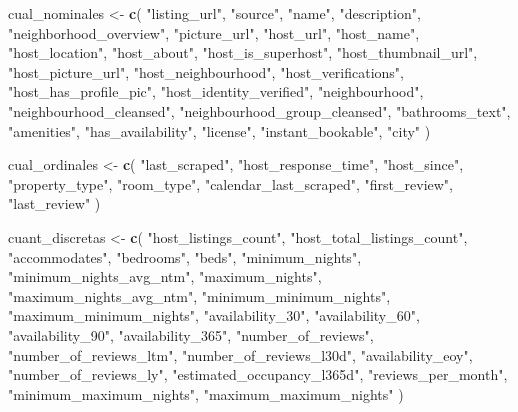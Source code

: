 \documentclass[
]{article}
\newenvironment{Shaded}{\begin{snugshade}}{\end{snugshade}}
\newcommand{\FunctionTok}[1]{\textcolor[rgb]{0.13,0.29,0.53}{\textbf{#1}}}
\newcommand{\NormalTok}[1]{#1}
\newcommand{\OtherTok}[1]{\textcolor[rgb]{0.56,0.35,0.01}{#1}}
\newcommand{\StringTok}[1]{\textcolor[rgb]{0.31,0.60,0.02}{#1}}
\begin{document}
\begin{Shaded}
\begin{Highlighting}[]
\NormalTok{cual\_nominales }\OtherTok{\textless{}{-}} \FunctionTok{c}\NormalTok{(}
    \StringTok{"listing\_url"}\NormalTok{,}
    \StringTok{"source"}\NormalTok{,}
    \StringTok{"name"}\NormalTok{,}
    \StringTok{"description"}\NormalTok{,}
    \StringTok{"neighborhood\_overview"}\NormalTok{,}
    \StringTok{"picture\_url"}\NormalTok{,}
    \StringTok{"host\_url"}\NormalTok{,}
    \StringTok{"host\_name"}\NormalTok{,}
    \StringTok{"host\_location"}\NormalTok{,}
    \StringTok{"host\_about"}\NormalTok{,}
    \StringTok{"host\_is\_superhost"}\NormalTok{,}
    \StringTok{"host\_thumbnail\_url"}\NormalTok{,}
    \StringTok{"host\_picture\_url"}\NormalTok{,}
    \StringTok{"host\_neighbourhood"}\NormalTok{,}
    \StringTok{"host\_verifications"}\NormalTok{,}
    \StringTok{"host\_has\_profile\_pic"}\NormalTok{,}
    \StringTok{"host\_identity\_verified"}\NormalTok{,}
    \StringTok{"neighbourhood"}\NormalTok{,}
    \StringTok{"neighbourhood\_cleansed"}\NormalTok{,}
    \StringTok{"neighbourhood\_group\_cleansed"}\NormalTok{,}
    \StringTok{"bathrooms\_text"}\NormalTok{,}
    \StringTok{"amenities"}\NormalTok{,}
    \StringTok{"has\_availability"}\NormalTok{,}
    \StringTok{"license"}\NormalTok{,}
    \StringTok{"instant\_bookable"}\NormalTok{,}
    \StringTok{"city"}
\NormalTok{)}

\NormalTok{cual\_ordinales }\OtherTok{\textless{}{-}} \FunctionTok{c}\NormalTok{(}
    \StringTok{"last\_scraped"}\NormalTok{,}
    \StringTok{"host\_response\_time"}\NormalTok{,}
    \StringTok{"host\_since"}\NormalTok{,}
    \StringTok{"property\_type"}\NormalTok{,}
    \StringTok{"room\_type"}\NormalTok{,}
    \StringTok{"calendar\_last\_scraped"}\NormalTok{,}
    \StringTok{"first\_review"}\NormalTok{,}
    \StringTok{"last\_review"}
\NormalTok{)}


\NormalTok{cuant\_discretas }\OtherTok{\textless{}{-}} \FunctionTok{c}\NormalTok{(}
    \StringTok{"host\_listings\_count"}\NormalTok{,}
    \StringTok{"host\_total\_listings\_count"}\NormalTok{,}
    \StringTok{"accommodates"}\NormalTok{,}
    \StringTok{"bedrooms"}\NormalTok{,}
    \StringTok{"beds"}\NormalTok{,}
    \StringTok{"minimum\_nights"}\NormalTok{,}
    \StringTok{"minimum\_nights\_avg\_ntm"}\NormalTok{,}
    \StringTok{"maximum\_nights"}\NormalTok{,}
    \StringTok{"maximum\_nights\_avg\_ntm"}\NormalTok{,}
    \StringTok{"minimum\_minimum\_nights"}\NormalTok{,}
    \StringTok{"maximum\_minimum\_nights"}\NormalTok{,}
    \StringTok{"availability\_30"}\NormalTok{,}
    \StringTok{"availability\_60"}\NormalTok{,}
    \StringTok{"availability\_90"}\NormalTok{,}
    \StringTok{"availability\_365"}\NormalTok{,}
    \StringTok{"number\_of\_reviews"}\NormalTok{,}
    \StringTok{"number\_of\_reviews\_ltm"}\NormalTok{,}
    \StringTok{"number\_of\_reviews\_l30d"}\NormalTok{,}
    \StringTok{"availability\_eoy"}\NormalTok{,}
    \StringTok{"number\_of\_reviews\_ly"}\NormalTok{,}
    \StringTok{"estimated\_occupancy\_l365d"}\NormalTok{,}
    \StringTok{"reviews\_per\_month"}\NormalTok{,}
    \StringTok{"minimum\_maximum\_nights"}\NormalTok{,}
    \StringTok{"maximum\_maximum\_nights"}
\NormalTok{)}


\end{Highlighting}
\end{Shaded}
\end{document}
